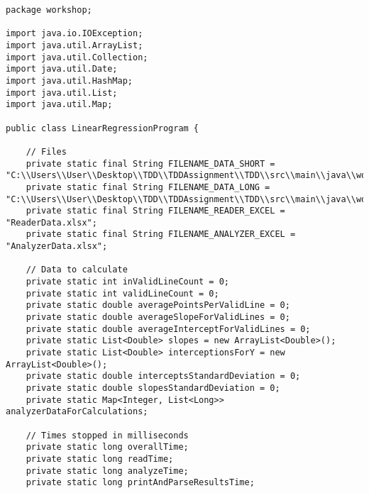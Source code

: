 \begin{lstlisting}
package workshop;

import java.io.IOException;
import java.util.ArrayList;
import java.util.Collection;
import java.util.Date;
import java.util.HashMap;
import java.util.List;
import java.util.Map;

public class LinearRegressionProgram {
	
	// Files 
	private static final String FILENAME_DATA_SHORT = "C:\\Users\\User\\Desktop\\TDD\\TDDAssignment\\TDD\\src\\main\\java\\workshop\\data_short.dat";
	private static final String FILENAME_DATA_LONG = "C:\\Users\\User\\Desktop\\TDD\\TDDAssignment\\TDD\\src\\main\\java\\workshop\\data_long.dat";
	private static final String FILENAME_READER_EXCEL = "ReaderData.xlsx"; 
	private static final String FILENAME_ANALYZER_EXCEL = "AnalyzerData.xlsx"; 
	
	// Data to calculate
	private static int inValidLineCount = 0;
	private static int validLineCount = 0;
	private static double averagePointsPerValidLine = 0;
	private static double averageSlopeForValidLines = 0;
	private static double averageInterceptForValidLines = 0;
	private static List<Double> slopes = new ArrayList<Double>();
	private static List<Double> interceptionsForY = new ArrayList<Double>();
	private static double interceptsStandardDeviation = 0;
	private static double slopesStandardDeviation = 0;
	private static Map<Integer, List<Long>> analyzerDataForCalculations;
	
	// Times stopped in milliseconds
	private static long overallTime;
	private static long readTime;
	private static long analyzeTime;
	private static long printAndParseResultsTime;
	

\end{lstlisting}
